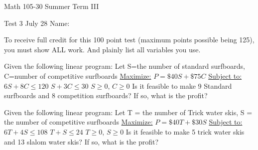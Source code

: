 \documentclass[11pt,epsfig]{article}
\begin{document}
Math 105-30 Summer Term III 

Test 3 July 28\hspace{1.9in} {Name:} {\underline {\hspace{3.5in}}}
\vspace{1pc}

To receive full credit for this 100 point test (maximum points possible being 125), you must show ALL work. And plainly list all variables you use.
\vspace{0.5pc}






\begin{problem}{10}
Given the following linear program:
\newline
\newline
Let S=the number of standard surfboards, C=number of competitive surfboards
\newline
\underline{Maximize:}\hspace*{0.5cm} $P=\$40S+\$75C$
\newline
\underline{Subject to:}\hspace*{0.45cm}
$6S+8C\leq 120$ 
\newline
\hspace*{2.4cm}$S+3C\leq 30$
\newline
\hspace*{2.4cm}$S \geq 0$, $C\geq 0$
\newline
\newline
Is it feasible to make 9 Standard surfboards and 8 competition surfboards? If so, what is the profit?
\vfill
\end{problem}





\begin{problem}{10}
Given the following linear program:
\newline
\newline
Let T = the number of Trick water skis, S = the number of competitive surfboards
\newline
\underline{Maximize:}\hspace*{0.5cm}  $P=\$40T+\$30S$
\newline
\underline{Subject to:}\hspace*{0.45cm} $6T+4S\leq 108$ 
\newline
\hspace*{2.4cm}$T+S\leq 24$
\newline
\hspace*{2.4cm}$T \geq 0$, $S\geq 0$
\newline
\newline
Is it feasible to make 5 trick water skis and 13 slalom water skis? If so, what is the profit?
\vfill
\end{problem}
\end{document}
